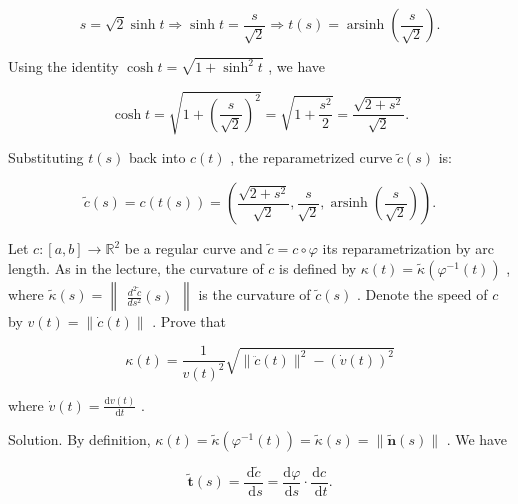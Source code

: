 \documentclass[10pt]{article}
\begin{document}
\[
s = \sqrt{2}\sinh t \Rightarrow  \sinh t = \frac{s}{\sqrt{2}} \Rightarrow  t\left( s\right)  = \operatorname{arsinh}\left( \frac{s}{\sqrt{2}}\right) .
\]

Using the identity \(\cosh t = \sqrt{1 + {\sinh }^{2}t}\) , we have

\[
\cosh t = \sqrt{1 + {\left( \frac{s}{\sqrt{2}}\right) }^{2}} = \sqrt{1 + \frac{{s}^{2}}{2}} = \frac{\sqrt{2 + {s}^{2}}}{\sqrt{2}}.
\]

Substituting \(t\left( s\right)\) back into \(c\left( t\right)\) , the reparametrized curve \(\widetilde{c}\left( s\right)\) is:

\[
\widetilde{c}\left( s\right)  = c\left( {t\left( s\right) }\right)  = \left( {\frac{\sqrt{2 + {s}^{2}}}{\sqrt{2}},\frac{s}{\sqrt{2}},\operatorname{arsinh}\left( \frac{s}{\sqrt{2}}\right) }\right) .
\]

\begin{problem}[title=PROBLEM 2 (6 POINTS)]
Let \(c : \left\lbrack  {a,b}\right\rbrack   \rightarrow  {\mathbb{R}}^{2}\) be a regular curve and \(\widetilde{c} = c \circ  \varphi\) its reparametrization by arc length. As in the lecture, the curvature of \(c\) is defined by \(\kappa \left( t\right)  = \widetilde{\kappa }\left( {{\varphi }^{-1}\left( t\right) }\right)\) , where \(\widetilde{\kappa }\left( s\right)  = \begin{Vmatrix}{\frac{{d}^{2}\widetilde{c}}{d{s}^{2}}\left( s\right) }\end{Vmatrix}\) is the curvature of \(\widetilde{c}\left( s\right)\) . Denote the speed of \(c\) by \(v\left( t\right)  = \parallel \dot{c}\left( t\right) \parallel\) . Prove that

\[
\kappa \left( t\right)  = \frac{1}{v{\left( t\right) }^{2}}\sqrt{\parallel \ddot{c}\left( t\right) {\parallel }^{2} - {\left( \dot{v}\left( t\right) \right) }^{2}}
\]

where \(\dot{v}\left( t\right)  = \frac{\mathrm{d}v\left( t\right) }{\mathrm{d}t}\) .
\end{problem}

Solution. By definition, \(\kappa \left( t\right)  = \widetilde{\kappa }\left( {{\varphi }^{-1}\left( t\right) }\right)  = \widetilde{\kappa }\left( s\right)  = \parallel \widetilde{\mathbf{n}}\left( s\right) \parallel\) . We have

\[
\widetilde{\mathbf{t}}\left( s\right)  = \frac{\mathrm{d}\widetilde{c}}{\mathrm{\;d}s} = \frac{\mathrm{d}\varphi }{\mathrm{d}s} \cdot  \frac{\mathrm{d}c}{\mathrm{\;d}t}.
\]
\end{document}

